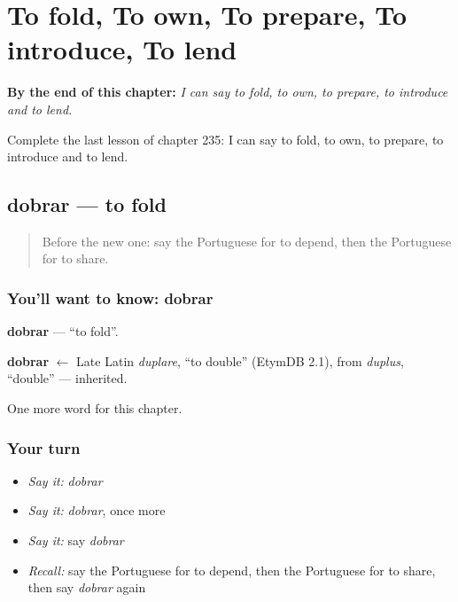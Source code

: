 
\chapter{To fold, To own, To prepare, To introduce, To lend}
\label{ch:pt-to-fold-to-own-to-prepare-to-introduce-to-lend}

\begin{chapteropening}
\textbf{By the end of this chapter:} \emph{I can say to fold, to own, to prepare, to introduce and to lend.}

Complete the last lesson of chapter 235: I can say to fold, to own, to prepare, to introduce and to lend.
\end{chapteropening}

\section[dobrar]{dobrar — to fold}

\label{lesson:PT-C235-dobrar}



\begin{quote}
Before the new one: say the Portuguese for to depend, then the Portuguese for to share.
\end{quote}

\subsection*{You'll want to know: dobrar}
\textbf{dobrar} — \textquotedblleft{}to fold\textquotedblright{}.

\begin{cousinweb}
\textbf{dobrar} $\leftarrow$ Late Latin \emph{duplare}, \textquotedblleft{}to double\textquotedblright{} (EtymDB 2.1), from \emph{duplus}, \textquotedblleft{}double\textquotedblright{} — inherited.
\end{cousinweb}

\begin{grammarlens}[title={What you've built}]
One more word for this chapter.
\end{grammarlens}

\subsection*{Your turn}
\begin{itemize}
\raggedright
  \item \emph{Say it:} \emph{dobrar}
  \item \emph{Say it:} \emph{dobrar}, once more
  \item \emph{Say it:} say \emph{dobrar}
  \item \emph{Recall:} say the Portuguese for to depend, then the Portuguese for to share, then say \emph{dobrar} again
\end{itemize}

